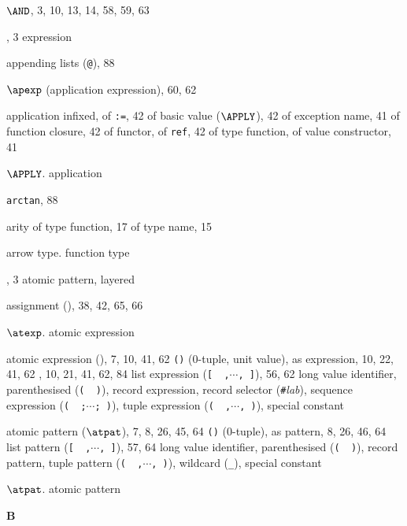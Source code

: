\begin{theindex}
\item $\AND$, 3, 10, 13, 14, 58, 59, 63
\item \ANDALSO, 3
\subitem\seealso expression
\item appending lists (\verb+@+), 88
\item $\apexp$ (application expression), 60, 62
\item application
\subitem infixed, \infixapplrefs
\subitem of {\tt :=}, 42
\subitem of basic value ($\APPLY$), 42
\subitem of exception name, 41
\subitem of function closure, 42
\subitem of functor, \funcapprefs
\subitem of {\tt ref}, 42
\subitem of type function, \typefunctionrefs
\subitem of value constructor, 41
\item $\APPLY$. \see application
\item {\tt arctan}, 88
\item arity
\subitem of type function, 17
\subitem of type name, 15
\item arrow type. \see function type
\item \AS, 3
\subitem \seealso atomic pattern, layered
\item assignment (\ml{:=}), 38, 42, 65, 66
\item $\atexp$. \see atomic expression
\item atomic expression (\atexp), 7, 10, 41, 62
\subitem \verb+()+ (0-tuple, unit value), \zeroexptuplerefs
\subitem as expression, 10, 22, 41, 62
\subitem {}, 10, 21, 41, 62, 84
\subitem list expression  (\verb+[  ,+$\cdots$\verb+, ]+), 56, 62
\subitem long value identifier, \vidinatexprefs
\subitem parenthesised (\verb+(  )+), \parexprefs
\subitem record expression, \recordexprefs
\subitem record selector (\verb+#+{\it lab}), \hashrefs
\subitem sequence expression  (\verb+(  ;+$\cdots$\verb+; )+), \sequenceexprefs
\subitem tuple expression (\verb+(  ,+$\cdots$\verb+, )+), \tupleexprefs
\subitem \seealso special constant
\item atomic pattern ($\atpat$), 7, 8, 26, 45, 64
\subitem \verb+()+ (0-tuple), \zeropattuplerefs
\subitem as pattern, 8, 26, 46, 64
\subitem list pattern (\verb+[  ,+$\cdots$\verb+, ]+), 57, 64
\subitem long value identifier, \vidinatpatrefs
\subitem parenthesised (\verb+(  )+), \parpatrefs
\subitem record pattern, \recordpatrefs
\subitem tuple pattern (\verb+(  ,+$\cdots$\verb+, )+), \tuplepatrefs
\subitem wildcard (\verb+_+),  \underscorewildrefs
\subitem \seealso special constant
\item $\atpat$. \see atomic pattern
\indexspace
\parbox{64mm}{\hfil{\large\bf B}\hfil}

\end{theindex}

